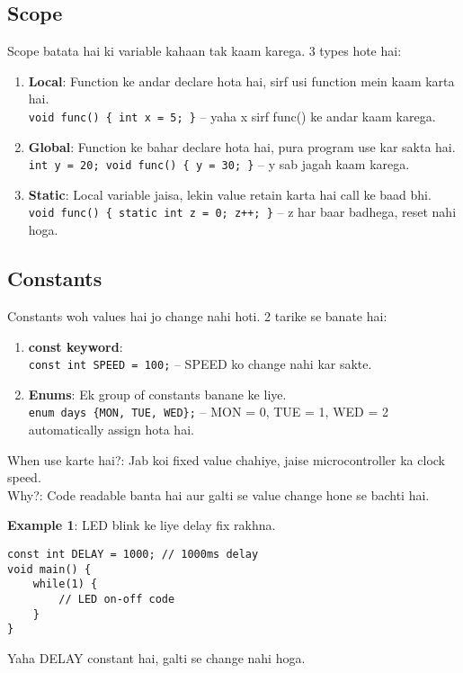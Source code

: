 \documentclass[a4paper,12pt]{article}
\begin{document}
\subsection*{Scope}
Scope batata hai ki variable kahaan tak kaam karega. 3 types hote hai: \\
\begin{enumerate}
    \item \textbf{Local}: Function ke andar declare hota hai, sirf usi function mein kaam karta hai. \\
          \texttt{void func() \{ int x = 5; \}} – yaha x sirf func() ke andar kaam karega.
    \item \textbf{Global}: Function ke bahar declare hota hai, pura program use kar sakta hai. \\
          \texttt{int y = 20; void func() \{ y = 30; \}} – y sab jagah kaam karega.
    \item \textbf{Static}: Local variable jaisa, lekin value retain karta hai call ke baad bhi. \\
          \texttt{void func() \{ static int z = 0; z++; \}} – z har baar badhega, reset nahi hoga.
\end{enumerate}

\subsection*{Constants}
Constants woh values hai jo change nahi hoti. 2 tarike se banate hai: \\
\begin{enumerate}
    \item \textbf{const keyword}: \\
          \texttt{const int SPEED = 100;} – SPEED ko change nahi kar sakte.
    \item \textbf{Enums}: Ek group of constants banane ke liye. \\
          \texttt{enum days \{MON, TUE, WED\};} – MON = 0, TUE = 1, WED = 2 automatically assign hota hai.
\end{enumerate}

\textcolor{warningred}{When use karte hai?}: Jab koi fixed value chahiye, jaise microcontroller ka clock speed. \\
\textcolor{warningred}{Why?}: Code readable banta hai aur galti se value change hone se bachti hai.

\begin{examplebox}
\textbf{Example 1}: LED blink ke liye delay fix rakhna. \\
\begin{lstlisting}
const int DELAY = 1000; // 1000ms delay
void main() {
    while(1) {
        // LED on-off code
    }
}
\end{lstlisting}
Yaha DELAY constant hai, galti se change nahi hoga.
\end{examplebox}
\end{document}
